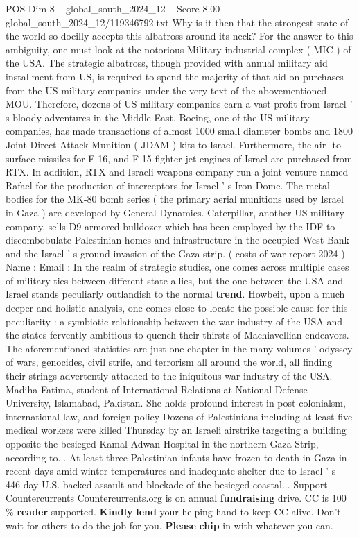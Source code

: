 \begin{textsample}{POS Dim 8 – global\_south\_2024\_12 – Score 8.00 – global\_south\_2024\_12/119346792.txt}
Why is it then that the strongest state of the world so docilly accepts this albatross around its neck?
For the answer to this ambiguity, one must look at the notorious Military industrial complex ( MIC ) of the USA.
The strategic albatross, though provided with annual military aid installment from US, is required to spend the majority of that aid on purchases from the US military companies under the very text of the abovementioned MOU.
Therefore, dozens of US military companies earn a vast profit from Israel ' s bloody adventures in the Middle East.
Boeing, one of the US military companies, has made transactions of almost 1000 small diameter bombs and 1800 Joint Direct Attack Munition ( JDAM ) kits to Israel.
Furthermore, the air -to-surface missiles for F-16, and F-15 fighter jet engines of Israel are purchased from RTX.
In addition, RTX and Israeli weapons company run a joint venture named Rafael for the production of interceptors for Israel ' s Iron Dome.
The metal bodies for the MK-80 bomb series ( the primary aerial munitions used by Israel in Gaza ) are developed by General Dynamics.
Caterpillar, another US military company, sells D9 armored bulldozer which has been employed by the IDF to discombobulate Palestinian homes and infrastructure in the occupied West Bank and the Israel ' s ground invasion of the Gaza strip. ( costs of war report 2024 ) Name : Email : In the realm of strategic studies, one comes across multiple cases of military ties between different state allies, but the one between the USA and Israel stands peculiarly outlandish to the normal \textbf{trend}.
Howbeit, upon a much deeper and holistic analysis, one comes close to locate the possible cause for this peculiarity : a symbiotic relationship between the war industry of the USA and the states fervently ambitious to quench their thirsts of Machiavellian endeavors.
The aforementioned statistics are just one chapter in the many volumes ' odyssey of wars, genocides, civil strife, and terrorism all around the world, all finding their strings advertently attached to the iniquitous war industry of the USA.
Madiha Fatima, student of International Relations at National Defense University, Islamabad, Pakistan.
She holds profound interest in post-colonialsm, international law, and foreign policy Dozens of Palestinians including at least five medical workers were killed Thursday by an Israeli airstrike targeting a building opposite the besieged Kamal Adwan Hospital in the northern Gaza Strip, according to...
At least three Palestinian infants have frozen to death in Gaza in recent days amid winter temperatures and inadequate shelter due to Israel ' s 446-day U.S.-backed assault and blockade of the besieged coastal...
Support Countercurrents Countercurrents.org is on annual \textbf{fundraising} drive.
CC is 100 \% \textbf{reader} supported. \textbf{Kindly} \textbf{lend} your helping hand to keep CC alive.
Don't wait for others to do the job for you. \textbf{Please} \textbf{chip} in with whatever you can.

\end{textsample}
